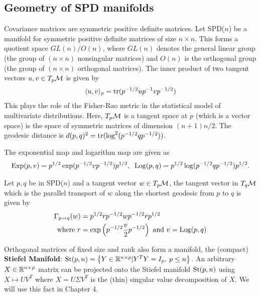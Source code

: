 \subsection*{Geometry of SPD manifolds}
Covariance matrices are symmetric positive definite matrices. 
Let SPD($n$) be a manifold for symmetric positive definite matrices of size $n\times n$. This forms a quotient space $GL(n)/O(n)$, where
$GL(n)$ denotes the general linear group (the group of $(n \times n)$ nonsingular matrices) and $O(n)$ is the orthogonal group 
(the group of $(n \times n)$ orthogonal matrices). 
%
The inner product of two tangent vectors $u,v \in T_{p}\mathcal{M}$ is given by 
\begin{equation}
\begin{split}
  \langle u,v \rangle_{p} = \operatorname{tr}(p^{-1/2}up^{-1}vp^{-1/2})
\end{split}
\label{eq:metricSPD}
\end{equation}
This plays the role of the Fisher-Rao metric in the statistical model of multivariate distributions.
Here, $T_{p}\mathcal{M}$ is a tangent space at $p$ (which is a vector space) is the space of symmetric matrices of dimension $(n+1)n/2$.
The geodesic distance is $d(p,q)^{2} = \operatorname{tr}( \log^{2}(p^{-1/2}qp^{-1/2}))$.


The exponential map and logarithm map are given as 
\begin{equation}
\begin{split}
  \operatorname*{Exp}(p,v) = p^{1/2} \exp(p^{-1/2}vp^{-1/2})p^{1/2}, \;\;
  \operatorname*{Log}(p,q) = p^{1/2} \log(p^{-1/2}qp^{-1/2})p^{1/2}.
\end{split}
\end{equation}

Let $p, q$ be in SPD($n$) and a tangent vector $w \in T_{p}\mathcal{M}$, the
tangent vector in $T_{q}\mathcal{M}$ which is the parallel transport of $w$ along
the shortest geodesic from $p$ to $q$ is given by 
\begin{equation}
\begin{split}
\Gamma_{p \rightarrow q}(w) &= p^{1/2}rp^{-1/2}wp^{-1/2}rp^{1/2} \\
\text{where } r &= \exp \left (p^{-1/2}\frac{v}{2}p^{-1/2} \right ) \text{ and
}v = \operatorname*{Log}(p,q)
\end{split}
\end{equation}

Orthogonal matrices of fixed size and rank also form a manifold, the (compact) \textbf{Stiefel Manifold}: $ \text{St}(p,n)=\left\{Y \in \mathbb{R}^{n\times p} | Y^TY=I_p,\: p \leq n\right\}$.
An arbitrary $X \in \mathbb{R}^{n \times p}$ matrix can be projected onto the Stiefel manifold $\text{St}(p,n)$ using $X \mapsto UV^T$ where $X=U\Sigma V^T$ is the (thin) singular value decomposition of $X$. We will use this fact in Chapter 4.